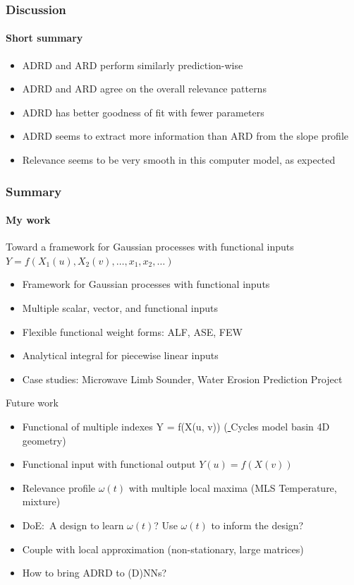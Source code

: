 \documentclass{snedecorbeamer}
\begin{document}
\begin{frame}
  \frametitle{Discussion}
  \framesubtitle{Short summary}

  \begin{itemize}
  \item ADRD and ARD perform similarly prediction-wise
  \item ADRD and ARD agree on the overall relevance patterns
  \item ADRD has better goodness of fit with fewer parameters
  \item ADRD seems to extract more information than ARD from the slope profile
  \item Relevance seems to be very smooth in this computer model, as expected
  \end{itemize}
\end{frame}

\begin{frame}
  \frametitle{Summary}
  \framesubtitle{My work}

  Toward a framework for Gaussian processes with functional inputs
  $Y = f(X_1(u), X_2(v), \dots, x_1, x_2, \dots)$
  \begin{itemize}
    \footnotesize
  \item Framework for Gaussian processes with functional inputs
  \item Multiple scalar, vector, and functional inputs
  \item Flexible functional weight forms: ALF, ASE, FEW
  \item \hyperlink{frm:validation}{}
    Analytical integral for piecewise linear inputs
  \item Case studies: Microwave Limb Sounder, Water Erosion Prediction Project
  \end{itemize}
  \vspace{3ex}

  Future work
  \begin{itemize}
    \footnotesize
  \item Functional of multiple indexes Y = f(X(u, v))
    (\href{https://psumodeling.github.io/Cycles/}{
      }
    Cycles model basin 4D geometry)
  \item Functional input with functional output $Y(u) = f(X(v))$
  \item Relevance profile $\omega(t)$ with multiple local maxima (MLS
    Temperature, mixture)
  \item DoE:~A design to learn $\omega(t)$? Use $\omega(t)$ to inform the
    design?
  \item Couple with local approximation (non-stationary, large matrices)
  \item How to bring ADRD to (D)NNs?
  \end{itemize}
\end{frame}
\end{document}
